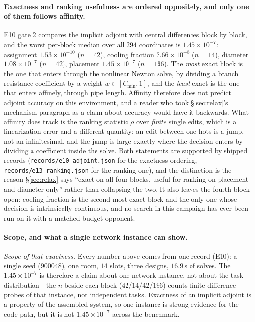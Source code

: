 \documentclass{article}
\begin{document}
\paragraph{Exactness and ranking usefulness are ordered oppositely, and only one of them
follows affinity.}
E10 gate 2 compares the implicit adjoint with central differences block by block, and the worst
per-block median over all $294$ coordinates is $1.45\times10^{-7}$: assignment $1.53\times10^{-10}$
($n = 42$), cooling fraction $3.66\times10^{-8}$ ($n = 14$), diameter $1.08\times10^{-7}$
($n = 42$), placement $1.45\times10^{-7}$ ($n = 196$).  The \emph{most} exact block is the one
that enters through the nonlinear Newton solve, by dividing a branch resistance coefficient by a
weight $w \in [C_{\min}, 1]$, and the \emph{least} exact is the one that enters affinely, through
pipe length.  Affinity therefore does not predict adjoint accuracy on this environment, and a
reader who took \S\ref{sec:relax}'s mechanism paragraph as a claim about accuracy would have it
backwards.  What affinity does track is the ranking statistic $\rho$ over \emph{finite} single
edits, which is a linearization error and a different quantity: an edit between one-hots is a
jump, not an infinitesimal, and the jump is large exactly where the decision enters by dividing a
coefficient inside the solve.  Both statements are supported by shipped records
(\texttt{records/e10\_adjoint.json} for the exactness ordering, \texttt{records/e13\_ranking.json}
for the ranking one), and the distinction is the reason \S\ref{sec:relax} says ``exact on all four
blocks, useful for ranking on placement and diameter only'' rather than collapsing the two.  It
also leaves the fourth block open: cooling fraction is the second most exact block and the only
one whose decision is intrinsically continuous, and no search in this campaign has ever been run
on it with a matched-budget opponent.

\paragraph{Scope, and what a single network instance can show.}
\emph{Scope of that exactness.}  Every number above comes from one record (E10): a
single seed (900048), one room, $14$ slots, three designs, $16.9$\,s of solves.  The
$1.45\times10^{-7}$ is therefore a claim about one network instance, not about the task
distribution---the $n$ beside each block ($42$/$14$/$42$/$196$) counts finite-difference
probes of that instance, not independent tasks.  Exactness of an implicit adjoint is a
property of the assembled system, so one instance is strong evidence for the code path,
but it is not $1.45\times10^{-7}$ across the benchmark.
\end{document}
